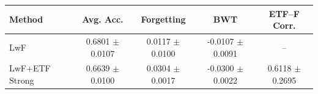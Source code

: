 \begin{tabular}{lcccc}
\hline
Method & Avg. Acc. & Forgetting & BWT & ETF--F Corr. \\ 
\hline
LwF & 0.6801 $\pm$ 0.0107 & 0.0117 $\pm$ 0.0100 & -0.0107 $\pm$ 0.0091 & -- \\ 
LwF+ETF Strong & 0.6639 $\pm$ 0.0100 & 0.0304 $\pm$ 0.0017 & -0.0300 $\pm$ 0.0022 & 0.6118 $\pm$ 0.2695 \\ 
\hline
\end{tabular}
